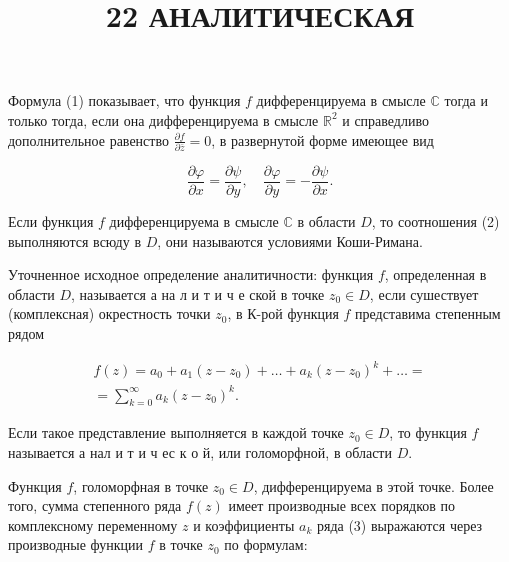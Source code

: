 \documentclass[10pt]{article}
\title{22 АНАЛИТИЧЕСКАЯ }
\author{}
\date{}
\begin{document}
\maketitle

Формула (1) показывает, что функция $f$ дифференцируема в смысле $\mathbb{C}$ тогда и только тогда, если она дифференцируема в смысле $\mathbb{R}^{2}$ и справедливо дополнительное равенство $\frac{\partial f}{\partial \bar{z}}=0$, в развернутой форме имеющее вид



\[

\frac{\partial \varphi}{\partial x}=\frac{\partial \psi}{\partial y}, \quad \frac{\partial \varphi}{\partial y}=-\frac{\partial \psi}{\partial x} .

\]



Если функция $f$ дифференцируема в смысле $\mathbb{C}$ в области $D$, то соотношения (2) выполняются всюду в $D$, они называются условиями Коши-Римана.



Уточненное исходное определение аналитичности: функция $f$, определенная в области $D$, называется а на л и т и ч е ской в точке $z_{0} \in D$, если сушествует (комплексная) окрестность точки $z_{0}$, в К-рой функция $f$ представима степенным рядом



\[

\begin{gathered}

f(z)=a_{0}+a_{1}\left(z-z_{0}\right)+\ldots+a_{k}\left(z-z_{0}\right)^{k}+\ldots= \\

=\sum_{k=0}^{\infty} a_{k}\left(z-z_{0}\right)^{k} .

\end{gathered}

\]



Если такое представление выполняется в каждой точке $z_{0} \in D$, то функция $f$ называется а нал и т и ч ес к о й, или голоморфной, в области $D$.



Функция $f$, голоморфная в точке $z_{0} \in D$, дифференцируема в этой точке. Более того, сумма степенного ряда $f(z)$ имеет производные всех порядков по комплексному переменному $z$ и коэффициенты $a_{k}$ ряда (3) выражаются через производные функции $f$ в точке $z_{0}$ по формулам:
\end{document}
